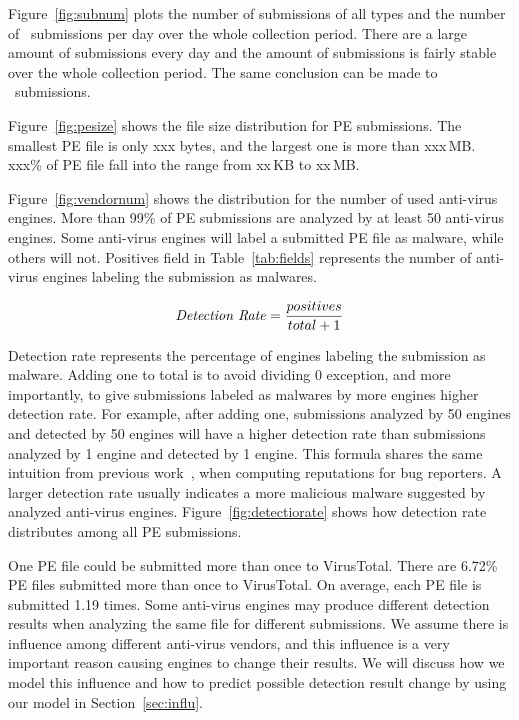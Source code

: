 

Figure~\ref{fig:subnum} plots the number of submissions of all types and the number of \pe\ submissions per day 
over the whole collection period.
There are a large amount of submissions every day
and the amount of submissions is fairly stable over the whole collection period.
The same conclusion can be made to \pe\ submissions.


Figure~\ref{fig:pesize} shows the file size distribution for PE submissions. 
The smallest PE file is only xxx bytes, and the largest one is more than xxx\,MB. 
xxx\% of PE file fall into the range from xx\,KB to xx\,MB. 



Figure~\ref{fig:vendornum} shows the distribution for the number of used anti-virus engines. 
More than 99\% of PE submissions are analyzed by at least 50 anti-virus engines. 
Some anti-virus engines will label a submitted PE file as malware, 
while others will not. 
Positives field in Table~\ref{tab:fields} represents the number of anti-virus engines labeling the submission as malwares. 

$$ \textrm{\textit{Detection Rate}} = \dfrac{positives}{total + 1}$$

Detection rate represents the percentage of engines labeling the submission as malware. 
Adding one to total is to avoid dividing 0 exception, and more importantly, 
to give submissions labeled as malwares by more engines higher detection rate. 
For example, after adding one, submissions analyzed by 50 engines and detected by 50 engines will have a higher detection rate 
than submissions analyzed by 1 engine and detected by 1 engine. 
This formula shares the same intuition from previous work~\cite{GuoICSE2010}, when computing reputations for bug reporters. 
A larger detection rate usually indicates a more malicious malware suggested by analyzed anti-virus engines. 
Figure~\ref{fig:detectiorate} shows how detection rate distributes among all PE submissions. 

One PE file could be submitted more than once to VirusTotal. 
There are 6.72\% PE files submitted more than once to VirusTotal. 
On average, each PE file is submitted 1.19 times. 
Some anti-virus engines may produce different detection results when analyzing the same file for different submissions.
We assume there is influence among different anti-virus vendors, 
and this influence is a very important reason causing engines to change their results.
We will discuss how we model this influence and how to predict possible detection result change by using our model in Section~\ref{sec:influ}.

